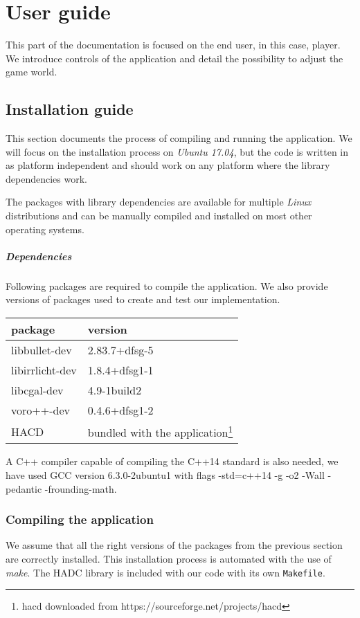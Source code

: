 \chapter{User guide}
This part of the documentation is focused on the end user, in this case, player. We introduce controls of the application and detail the possibility to adjust the game world.

\section{Installation guide}

This section documents the process of compiling and running the application. We will focus on the installation process on \emph{Ubuntu 17.04}, but the code is written in as platform independent and should work on any platform where the library dependencies work.

The packages with library dependencies are available for multiple \emph{Linux}
distributions and can be manually compiled and installed on most other
operating systems.

\paragraph{Dependencies}
Following packages are required to compile the application. We also provide versions of packages used to create and test our implementation.
\begin{center}
\begin{tabular}{ll}
package & version \\
\hline
libbullet-dev & 2.83.7+dfsg-5 \\
libirrlicht-dev & 1.8.4+dfsg1-1 \\
libcgal-dev & 4.9-1build2 \\
voro++-dev & 0.4.6+dfsg1-2 \\
HACD & bundled with the application\footnote{hacd downloaded from https://sourceforge.net/projects/hacd}
\end{tabular}
\end{center}

A C++ compiler capable of compiling the C++14 standard is also needed, we have used GCC version 6.3.0-2ubuntu1 with flags -std=c++14 -g -o2 -Wall -pedantic -frounding-math.

\subsection*{Compiling the application}
We assume that all the right versions of the packages from the previous section are correctly installed. This installation process is automated with the use of \emph{make}. The HADC library is included with our code with its own {\tt Makefile}.

